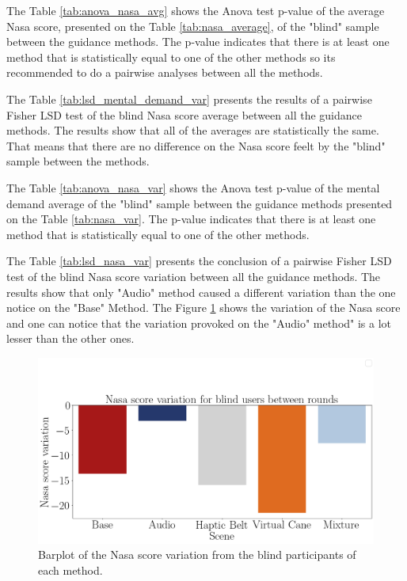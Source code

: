 The Table \ref{tab:anova_nasa_avg} shows the Anova test p-value of the average Nasa score, presented on the Table \ref{tab:nasa_average}, of the "blind" sample between the guidance methods. The p-value indicates that there is at least one method that is statistically equal to one of the other methods so its recommended to do a pairwise analyses between all the methods.



The Table \ref{tab:lsd_mental_demand_var} presents the results of a pairwise Fisher LSD test of the blind Nasa score average between all the guidance methods. The results show that all of the averages are statistically the same. That means that there are no difference on the Nasa score feelt by the "blind" sample between the methods.



The Table \ref{tab:anova_nasa_var} shows the Anova test p-value of the mental demand average of the "blind" sample between the guidance methods presented on the Table \ref{tab:nasa_var}. The p-value indicates that there is at least one method that is statistically equal to one of the other methods.





The Table \ref{tab:lsd_nasa_var} presents the conclusion of a pairwise Fisher LSD test of the blind Nasa score variation between all the guidance methods. The results show that only "Audio" method caused a different variation than the one notice on the "Base" Method. The Figure \ref{fig:barplot_nasa_var_scene_blind} shows the variation of the Nasa score and one can notice that the variation provoked on the "Audio" method" is a lot lesser than the other ones.





\begin{figure}[!htb]
    \centering
    \includegraphics[width = 0.8\linewidth]{Resultados/Nasa/Figuras/png/barplot_nasa_var_scene_blind.png}
    \caption{Barplot of the Nasa score variation from the blind participants of each method.}
    \label{fig:barplot_nasa_var_scene_blind}
\end{figure}

